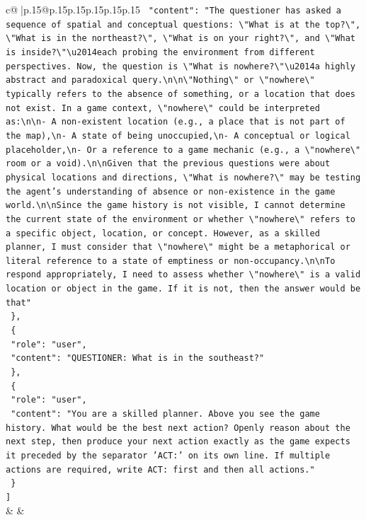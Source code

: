 \documentclass{article}
\begin{document}
{\begin{supertabular}{c@{$\;$}|p{.15\linewidth}@{}p{.15\linewidth}p{.15\linewidth}p{.15\linewidth}p{.15\linewidth}p{.15\linewidth}}
{{{\texttt{    "content": "The questioner has asked a sequence of spatial and conceptual questions: \textbackslash{}"What is at the top?\textbackslash{}", \textbackslash{}"What is in the northeast?\textbackslash{}", \textbackslash{}"What is on your right?\textbackslash{}", and \textbackslash{}"What is inside?\textbackslash{}"\textbackslash{}u2014each probing the environment from different perspectives. Now, the question is \textbackslash{}"What is nowhere?\textbackslash{}"\textbackslash{}u2014a highly abstract and paradoxical query.\textbackslash{}n\textbackslash{}n\textbackslash{}"Nothing\textbackslash{}" or \textbackslash{}"nowhere\textbackslash{}" typically refers to the absence of something, or a location that does not exist. In a game context, \textbackslash{}"nowhere\textbackslash{}" could be interpreted as:\textbackslash{}n\textbackslash{}n{-} A non{-}existent location (e.g., a place that is not part of the map),\textbackslash{}n{-} A state of being unoccupied,\textbackslash{}n{-} A conceptual or logical placeholder,\textbackslash{}n{-} Or a reference to a game mechanic (e.g., a \textbackslash{}"nowhere\textbackslash{}" room or a void).\textbackslash{}n\textbackslash{}nGiven that the previous questions were about physical locations and directions, \textbackslash{}"What is nowhere?\textbackslash{}" may be testing the agent's understanding of absence or non{-}existence in the game world.\textbackslash{}n\textbackslash{}nSince the game history is not visible, I cannot determine the current state of the environment or whether \textbackslash{}"nowhere\textbackslash{}" refers to a specific object, location, or concept. However, as a skilled planner, I must consider that \textbackslash{}"nowhere\textbackslash{}" might be a metaphorical or literal reference to a state of emptiness or non{-}occupancy.\textbackslash{}n\textbackslash{}nTo respond appropriately, I need to assess whether \textbackslash{}"nowhere\textbackslash{}" is a valid location or object in the game. If it is not, then the answer would be that"} \\
\texttt{  \},} \\
\texttt{  \{} \\
\texttt{    "role": "user",} \\
\texttt{    "content": "QUESTIONER: What is in the southeast?"} \\
\texttt{  \},} \\
\texttt{  \{} \\
\texttt{    "role": "user",} \\
\texttt{    "content": "You are a skilled planner. Above you see the game history. What would be the best next action? Openly reason about the next step, then produce your next action exactly as the game expects it preceded by the separator 'ACT:' on its own line. If multiple actions are required, write ACT: first and then all actions."} \\
\texttt{  \}} \\
\texttt{{]}} \\
            }
        }
    }
    & & \\ \\


\end{supertabular}}
\end{document}
